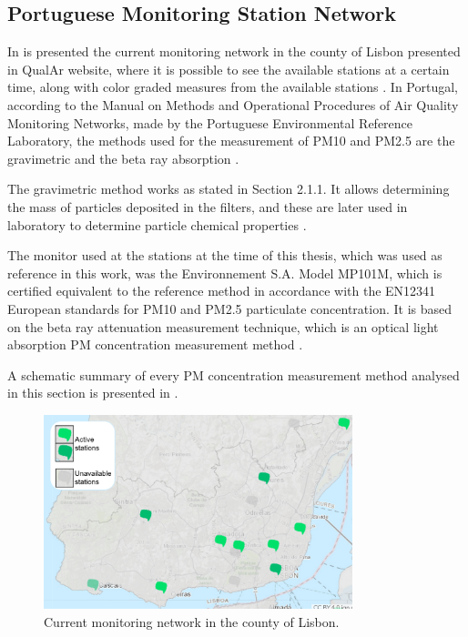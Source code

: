 \subsection{Portuguese Monitoring Station Network}

In  is presented the current monitoring network in the county of Lisbon presented in QualAr website, where it is possible to see the available stations at a certain time, along with color graded measures from the available stations \cite{QualAr}.
In Portugal, according to the Manual on Methods and Operational Procedures of Air Quality Monitoring Networks, made by the Portuguese Environmental Reference Laboratory, the methods used for the measurement of PM10 and PM2.5 are the gravimetric and the beta ray absorption \cite{LaboratoriodeReferenciadoAmbiente2010}.

The gravimetric method works as stated in Section 2.1.1. It allows determining the mass of particles deposited in the filters, and these are later used in laboratory to determine particle chemical properties \cite{LaboratoriodeReferenciadoAmbiente2010}.


The monitor used at the stations at the time of this thesis, which was used as reference in this work, was the Environnement S.A. Model MP101M, which is certified equivalent to the reference method in accordance with the EN12341 European standards for PM10 and PM2.5 particulate concentration. It is based on the beta ray attenuation measurement technique, which is an optical light absorption PM concentration measurement method \cite{environnementSA}.

A schematic summary of every PM concentration measurement method analysed in this section is presented in .

\begin{figure}[ht]
\centering
\includegraphics[width=0.8\textwidth]{./Images/apa-stations-location.PNG}
\caption{Current monitoring network in the county of Lisbon.}
\label{fig:apa-stations-location}
\end{figure}

